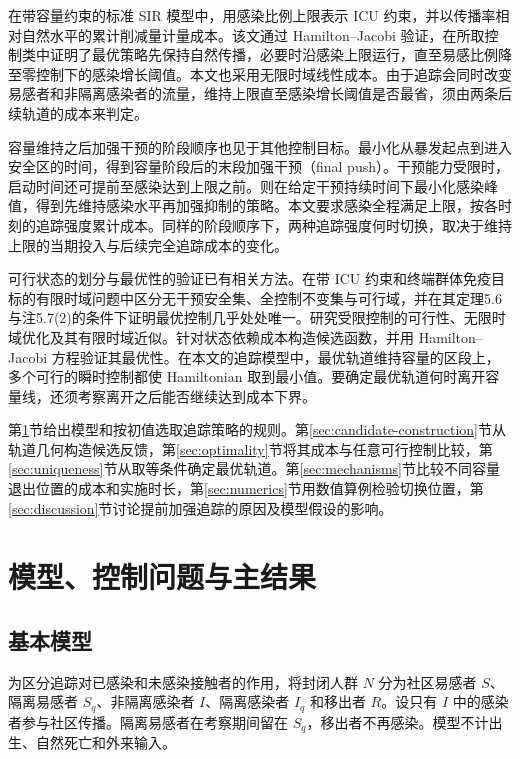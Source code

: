 \documentclass[lang=cn,a4paper,newtx]{elegantpaper}
\theoremstyle{plain}
\theoremstyle{definition}
\begin{document}
在带容量约束的标准 SIR 模型中，\textcite{MicloSpiroWeibull2022}用感染比例上限表示 ICU 约束，并以传播率相对自然水平的累计削减量计量成本。该文通过 Hamilton--Jacobi 验证，在所取控制类中证明了最优策略先保持自然传播，必要时沿感染上限运行，直至易感比例降至零控制下的感染增长阈值。本文也采用无限时域线性成本。由于追踪会同时改变易感者和非隔离感染者的流量，维持上限直至感染增长阈值是否最省，须由两条后续轨道的成本来判定。

容量维持之后加强干预的阶段顺序也见于其他控制目标。\textcite{Angulo2021}最小化从暴发起点到进入安全区的时间，得到容量阶段后的末段加强干预（final push）。干预能力受限时，启动时间还可提前至感染达到上限之前\parencite[图3b]{Angulo2021}。\textcite{Morris2021}则在给定干预持续时间下最小化感染峰值，得到先维持感染水平再加强抑制的策略。本文要求感染全程满足上限，按各时刻的追踪强度累计成本。同样的阶段顺序下，两种追踪强度何时切换，取决于维持上限的当期投入与后续完全追踪成本的变化。

可行状态的划分与最优性的验证已有相关方法。\textcite{AvramFreddiGoreac2022}在带 ICU 约束和终端群体免疫目标的有限时域问题中区分无干预安全集、全控制不变集与可行域，并在其定理5.6与注5.7(2)的条件下证明最优控制几乎处处唯一。\textcite{FreddiGoreac2024}研究受限控制的可行性、无限时域优化及其有限时域近似。\textcite{FreddiGoreacLiXu2022}针对状态依赖成本构造候选函数，并用 Hamilton--Jacobi 方程验证其最优性。在本文的追踪模型中，最优轨道维持容量的区段上，多个可行的瞬时控制都使 Hamiltonian 取到最小值。要确定最优轨道何时离开容量线，还须考察离开之后能否继续达到成本下界。

第\ref{sec:model}节给出模型和按初值选取追踪策略的规则。第\ref{sec:candidate-construction}节从轨道几何构造候选反馈，第\ref{sec:optimality}节将其成本与任意可行控制比较，第\ref{sec:uniqueness}节从取等条件确定最优轨道。第\ref{sec:mechanisms}节比较不同容量退出位置的成本和实施时长，第\ref{sec:numerics}节用数值算例检验切换位置，第\ref{sec:discussion}节讨论提前加强追踪的原因及模型假设的影响。

\section{模型、控制问题与主结果}
\label{sec:model}
\label{sec:main-results}

\subsection{基本模型}

为区分追踪对已感染和未感染接触者的作用，将封闭人群 $N$ 分为社区易感者 $S$、隔离易感者 $S_q$、非隔离感染者 $I$、隔离感染者 $I_q$ 和移出者 $R$。设只有 $I$ 中的感染者参与社区传播。隔离易感者在考察期间留在 $S_q$，移出者不再感染。模型不计出生、自然死亡和外来输入。
\end{document}
